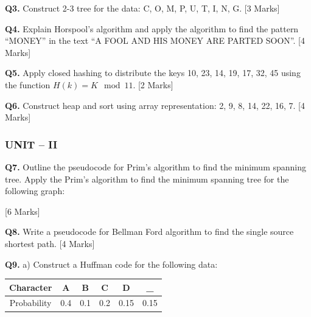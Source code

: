 \documentclass[11pt,a4paper]{article}
\begin{document}
\textbf{Q3.} Construct 2-3 tree for the data: C, O, M, P, U, T, I, N, G. \hfill [3 Marks]

\textbf{Q4.} Explain Horspool's algorithm and apply the algorithm to find the pattern ``MONEY'' in the text ``A FOOL AND HIS MONEY ARE PARTED SOON''. \hfill [4 Marks]

\textbf{Q5.} Apply closed hashing to distribute the keys 10, 23, 14, 19, 17, 32, 45 using the function $H(k) = K \mod 11$. \hfill [2 Marks]

\textbf{Q6.} Construct heap and sort using array representation: 2, 9, 8, 14, 22, 16, 7. \hfill [4 Marks]

\subsubsection*{UNIT -- II}

\textbf{Q7.} Outline the pseudocode for Prim's algorithm to find the minimum spanning tree. Apply the Prim's algorithm to find the minimum spanning tree for the following graph:

\begin{center}
\end{center}
\hfill [6 Marks]

\textbf{Q8.} Write a pseudocode for Bellman Ford algorithm to find the single source shortest path. \hfill [4 Marks]

\textbf{Q9.} a) Construct a Huffman code for the following data:

\begin{center}
\begin{tabular}{|c|c|c|c|c|c|}
\hline
Character & A & B & C & D & \_ \\
\hline
Probability & 0.4 & 0.1 & 0.2 & 0.15 & 0.15 \\
\hline
\end{tabular}
\end{center}
\end{document}
